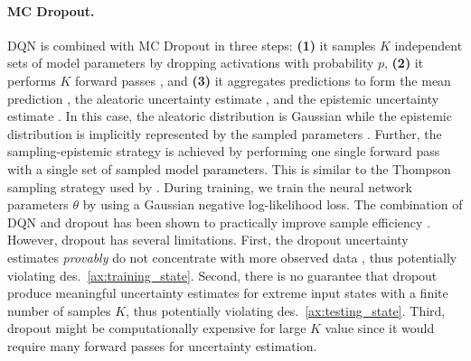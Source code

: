 \paragraph{MC Dropout.} DQN is combined with MC Dropout \citep{dropout} in three steps: \textbf{(1)} it samples $K$ independent sets of model parameters  by dropping activations with probability $p$, \textbf{(2)} it performs $K$ forward passes , and \textbf{(3)} it aggregates predictions to form the mean prediction , the aleatoric uncertainty estimate , and the epistemic uncertainty estimate . In this case, the aleatoric distribution is Gaussian while the epistemic distribution is implicitly represented by the sampled parameters . Further, the sampling-epistemic strategy is achieved by performing one single forward pass with a single set of sampled model parameters. This is similar to the Thompson sampling strategy used by \citet{dropout}. During training, we train the neural network parameters $\theta$ by using a Gaussian negative log-likelihood loss. The combination of DQN and dropout has been shown to practically improve sample efficiency \citet{dropout}. However, dropout has several limitations. First, the dropout uncertainty estimates \emph{provably} do not concentrate with more observed data \citep{randomized-prior-functions}, thus potentially violating des.~\ref{ax:training_state}. Second, there is no guarantee that dropout produce meaningful uncertainty estimates for extreme input states with a finite number of samples $K$, thus potentially violating des.~\ref{ax:testing_state}. Third, dropout might be computationally expensive for large $K$ value since it would require many forward passes for uncertainty estimation.

